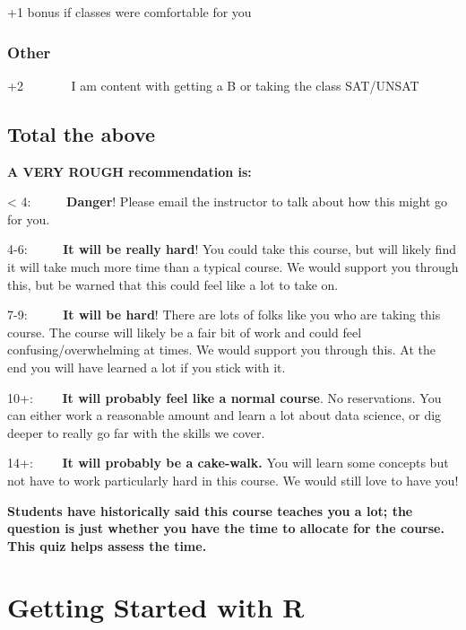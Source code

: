 \documentclass[
  letterpaper,
  DIV=11,
  numbers=noendperiod]{scrreprt}
\begin{document}
+1 bonus if classes were comfortable for you

\subsection*{\texorpdfstring{\textbf{Other}}{Other}}\label{other}

+2~~~~~~~ I am content with getting a B or taking the class SAT/UNSAT

\section*{Total the above}\label{total-the-above}


\textbf{A VERY ROUGH recommendation is:}

\textless{} 4:~~~~~ \textbf{Danger}! Please email the instructor to talk
about how this might go for you.

4-6:~~~~~ \textbf{It will be really hard}! You could take this course,
but will likely find it will take much more time than a typical course.
We would support you through this, but be warned that this could feel
like a lot to take on.

7-9:~~~~~ \textbf{It will be hard}! There are lots of folks like you who
are taking this course. The course will likely be a fair bit of work and
could feel confusing/overwhelming at times. We would support you through
this. At the end you will have learned a lot if you stick with it.

10+:~~~~ \textbf{It will probably feel like a normal course}. No
reservations. You can either work a reasonable amount and learn a lot
about data science, or dig deeper to really go far with the skills we
cover.

14+:~~~~ \textbf{It will probably be a cake-walk.} You will learn some
concepts but not have to work particularly hard in this course. We would
still love to have you!

\textbf{Students have historically said this course teaches you a lot;
the question is just whether you have the time to allocate for the
course. This quiz helps assess the time.}


\chapter*{Getting Started with R}\label{getting-started-with-r}
\end{document}
